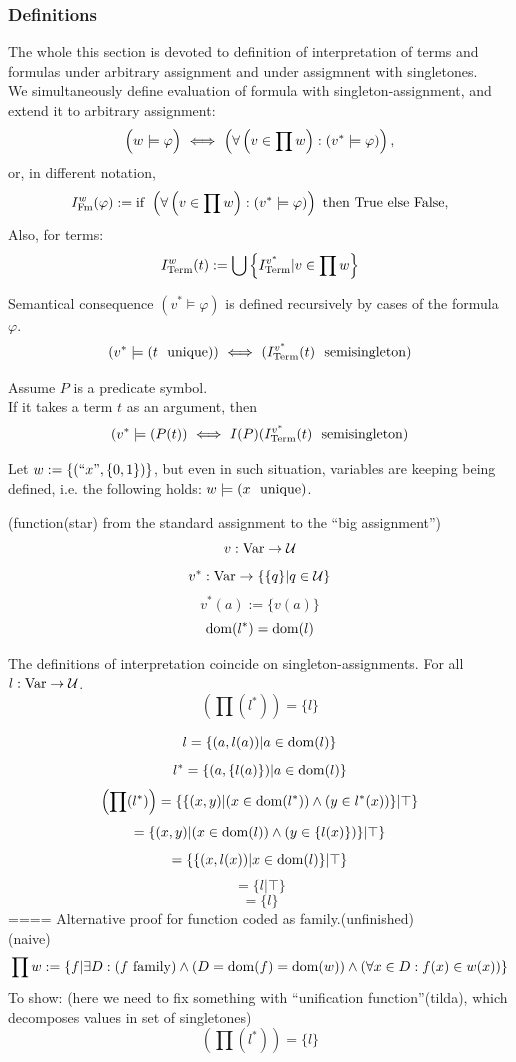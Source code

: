 \subsubsection{Definitions}
The whole this section is devoted to definition of interpretation of terms and formulas under arbitrary assignment and under assigmnent with singletones.\\
We simultaneously define evaluation of formula with singleton-assignment, and extend it to arbitrary assignment:
\[
\left(w\models\varphi\vphantom\prod\right)\IFF
\left(\forall \left(v\in\prod w\right):
\left(v^*\models\varphi\right)\right),
\]
or, in  different notation,
\[
I^w_{\mathrm{Fm}}(\varphi):=
\mathrm{if}
\ \left(
\forall \left(v\in\prod w\right):
\left(v^*\models\varphi\right)
\right)
\ \mathrm{then}
\ \mathrm{True}
\ \mathrm{else}
\ \mathrm{False},
\]
Also, for terms:
\[
I^w_{\mathrm{Term}}(t):=
\bigcup \left\{ I^{v^*}_{\mathrm{Term}} 
|v\in\prod w\right\}
\]

Semantical consequence $\left(v^*\models\varphi\right)$ is defined recursively by cases of the formula $\varphi$.
\[
(v^*\models(t\ \mathrm{\ unique}))\ \Longleftrightarrow\  (I^{v^*}_{\mathrm{Term}}(t)\ \mathrm{\ semisingleton})
\]

Assume $P$ is a predicate symbol.\\
If it takes a term $t$ as an argument, then
\[
(v^*\models(P(t))\ \Longleftrightarrow\  I(P)(I^{v^*}_{\mathrm{Term}}(t)\ \mathrm{\ semisingleton})
\]
\begin{example*}
Let $w:=\{(``x",\{0,1\})\}$, but even in such situation, variables are keeping being defined, i.e. the following holds: $w\models(x\ \lunique)$.
\end{example*}

\begin{definition}(function(star) from the standard assignment to the ``big assignment'')
\[
v:\mathrm{Var}\to\mathcal{U}
\]
\[
v^*:\mathrm{Var}\to\{\{q\}|q\in\mathcal{U}\}
\]
\[
v^*(a):=\{v(a)\}
\]
\[
\mathrm{dom}(l^*)=\mathrm{dom}(l)
\]
\end{definition}

\begin{theorem}
The definitions of interpretation coincide on singleton-assignments.
For all $l:\mathrm{Var}\to\mathcal{U}$.
\[
\left(\prod (l^*)\right)=\{l\}
\]
\end{theorem}
\Proof
\[
l=\{(a,l(a))|a\in\mathrm{dom}(l)\}
\]
\[
l^*=\{(a,\{l(a)\})|a\in\mathrm{dom}(l)\}
\]
\[
\left(\prod (l^*)\right)=
\{\{(x,y)|(x\in \mathrm{dom}(l^*)) \land (y\in l^*(x))\}|\top\}
\]
\[
=\{(x,y)|(x\in \mathrm{dom}(l)) \land (y\in \{l(x)\})\}|\top\}
\]
\[
=\{\{(x,l(x))|x\in\mathrm{dom}(l)\}|\top\}
\]
\[
=\{l|\top\}
\]
\[
=\{l\}
\]
\iftrue
==== Alternative proof for function coded as family.(unfinished)\\
(naive)
\[
\prod w := \{f | \exists D: (f\mathrm{\ family}) \land (D = \mathrm{dom}(f)=\mathrm{dom}(w)) \land (\forall x\in D: f(x) \in w(x)) \}
\]
To show: (here we need to fix something with ``unification function''(tilda), which decomposes values in set of singletones)
\[
\left(\prod (l^*)\right)=\{l\}
\]

